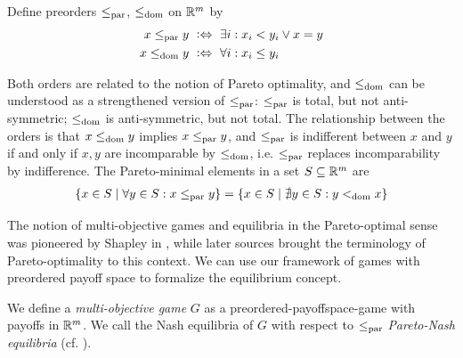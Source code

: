 \documentclass[a4paper]{scrreprt}
\begin{document}
    \begin{defn}
        Define preorders $\leq_{\text{par}}$, $\leq_{\text{dom}}$ on $\mathbb{R}^m$ by
        \begin{align*}
        	x \leq_{\text{par}} y ~ & \mathrel{\vcentcolon\Leftrightarrow}~ \exists i: x_i < y_i \vee x = y \\
        	x \leq_{\text{dom}} y ~    & \mathrel{\vcentcolon\Leftrightarrow}~ \forall i: x_i \leq y_i
        \end{align*}
    \end{defn}
    Both orders are related to the notion of Pareto optimality, and $\leq_{\text{dom}}$ can be understood as a strengthened version of $\leq_{\text{par}}$:
    $\leq_{\text{par}}$ is total, but not anti-symmetric; $\leq_{\text{dom}}$ is anti-symmetric, but not total.
    The relationship between the orders is that $x \leq_{\text{dom}} y$ implies $x \leq_{\text{par}} y$,
    and $\leq_{\text{par}}$ is indifferent between $x$ and $y$ if and only if $x, y$ are incomparable by $\leq_{\text{dom}}$, i.e. $\leq_{\text{par}}$ replaces incomparability by indifference.
    The Pareto-minimal elements in a set $S \subseteq \mathbb{R}^m$ are
    \begin{gather*}
        \{x \in S \mid \forall y \in S: x \leq_{\text{par}} y\} = \{x \in S \mid \nexists y \in S: y <_{\text{dom}} x\}
    \end{gather*}    
    
    The notion of multi-objective games and equilibria in the Pareto-optimal sense was pioneered by Shapley in \cite{bib:shapleyMultiobjectiveEquilibriumPoints},
    while later sources brought the terminology of Pareto-optimality to this context. %
    We can use our framework of games with preordered payoff space to formalize the equilibrium concept.
    
    \begin{defn}
        We define a \emph{multi-objective game} $G$ as a preordered-payoffspace-game with payoffs in $\mathbb{R}^m$.
        We call the Nash equilibria of $G$ with respect to $\leq_{\text{par}}$ \emph{Pareto-Nash equilibria} (cf. \cite{bib:paretoNashEquilibria}).
    \end{defn}
\end{document}
